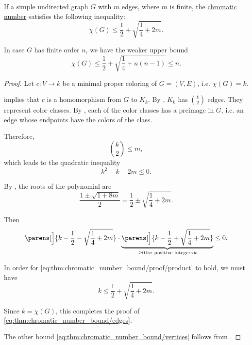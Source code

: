 \begin{proposition}\label{thm:chromatic_number_bound}
  If a simple undirected graph \( G \) with \( m \) edges, where \( m \) is finite, the \hyperref[def:chromatic_number]{chromatic number} satisfies the following inequality:
  \begin{equation}\label{eq:thm:chromatic_number_bound/edges}
    \chi(G) \leq \frac 1 2 + \sqrt{ \frac 1 4 + 2m }.
  \end{equation}

  In case \( G \) has finite order \( n \), we have the weaker upper bound
  \begin{equation}\label{eq:thm:chromatic_number_bound/vertices}
    \chi(G) \leq \frac 1 2 + \sqrt{ \frac 1 4 + n(n - 1) } \leq n.
  \end{equation}
\end{proposition}
\begin{proof}
  Let \( c: V \to k \) be a minimal proper coloring of \( G = (V, E) \), i.e. \( \chi(G) = k \).

   implies that \( c \) is a homomorphism from \( G \) to \( K_k \). By , \( K_k \) has \( \binom k 2 \) edges. They represent color classes. By , each of the color classes has a preimage in \( G \), i.e. an edge whose endpoints have the colors of the class.

  Therefore,
  \begin{equation*}
    \binom k 2 \leq m,
  \end{equation*}
  which leads to the quadratic inequality
  \begin{equation*}
    k^2 - k - 2m \leq 0.
  \end{equation*}

  By , the roots of the polynomial are
  \begin{equation*}
    \frac { 1 \pm \sqrt{ 1 + 8m } } 2 = \frac 1 2 \pm \sqrt{ \frac 1 4 + 2m }.
  \end{equation*}

  Then
  \begin{equation}\label{eq:thm:chromatic_number_bound/proof/product}
    \parens[\Big]{ k - \frac 1 2 - \sqrt{ \frac 1 4 + 2m } } \cdot \underbrace{\parens[\Big]{ k - \frac 1 2 + \sqrt{ \frac 1 4 + 2m } }}_{\geq 0 \T*{for positive integers} k} \leq 0.
  \end{equation}

  In order for \eqref{eq:thm:chromatic_number_bound/proof/product} to hold, we must have
  \begin{equation*}
    k \leq \frac 1 2 + \sqrt{ \frac 1 4 + 2m }.
  \end{equation*}

  Since \( k = \chi(G) \), this completes the proof of \eqref{eq:thm:chromatic_number_bound/edges}.

  The other bound \eqref{eq:thm:chromatic_number_bound/vertices} follows from .
\end{proof}

